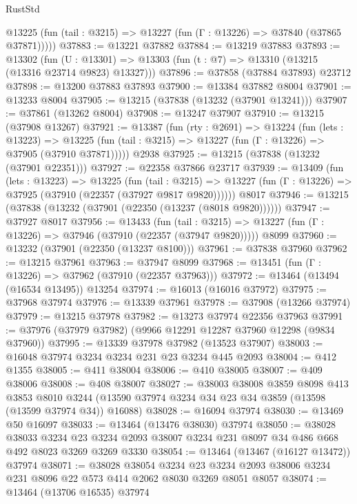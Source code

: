 \begin{lexlean}{RustStd}
\begin{coremodule}
      @13225 (fun (tail : @3215) => @13227 (fun (Γ : @13226) => @37840 (@37865 @37871)))))
@37883 := @13221 @37882
@37884 := @13219 @37883
@37893 := @13302
    (fun (U : @13301) => @13303 (fun (t : @7) => @13310 (@13215 (@13316 @23714 @9823) @13327)))
@37896 := @37858 (@37884 @37893) @23712
@37898 := @13200 @37883 @37893
@37900 := @13384 @37882 @8004
@37901 := @13233 @8004
@37905 := @13215 (@37838 (@13232 (@37901 @13241)))
@37907 := @37861 (@13262 @8004)
@37908 := @13247 @37907
@37910 := @13215 (@37908 @13267)
@37921 := @13387
    (fun (rty : @2691) =>
    @13224
      (fun (lets : @13223) =>
      @13225 (fun (tail : @3215) => @13227 (fun (Γ : @13226) => @37905 (@37910 @37871)))))
    @2938
@37925 := @13215 (@37838 (@13232 (@37901 @22351)))
@37927 := @22358 @37866 @23717
@37939 := @13409
    (fun (lets : @13223) =>
    @13225
      (fun (tail : @3215) =>
      @13227 (fun (Γ : @13226) => @37925 (@37910 (@22357 (@37927 @9817 @9820))))))
    @8017
@37946 := @13215 (@37838 (@13232 (@37901 (@22350 (@13237 (@8018 @9820))))))
@37947 := @37927 @8017
@37956 := @13433
    (fun (tail : @3215) => @13227 (fun (Γ : @13226) => @37946 (@37910 (@22357 (@37947 @9820)))))
    @8099
@37960 := @13232 (@37901 (@22350 (@13237 @8100)))
@37961 := @37838 @37960
@37962 := @13215 @37961
@37963 := @37947 @8099
@37968 := @13451 (fun (Γ : @13226) => @37962 (@37910 (@22357 @37963)))
@37972 := @13464 (@13494 (@16534 @13495)) @13254
@37974 := @16013 (@16016 @37972)
@37975 := @37968 @37974
@37976 := @13339 @37961
@37978 := @37908 (@13266 @37974)
@37979 := @13215 @37978
@37982 := @13273 @37974 @22356 @37963
@37991 := @37976 (@37979 @37982) (@9966 @12291 @12287 @37960 @12298 (@9834 @37960))
@37995 := @13339 @37978 @37982 (@13523 @37907)
@38003 := @16048 @37974 @3234 @3234 @231 @23 @3234 @445 @2093
@38004 := @412 @1355
@38005 := @411 @38004
@38006 := @410 @38005
@38007 := @409 @38006
@38008 := @408 @38007
@38027 := @38003
    @38008
    @3859
    @8098
    @413
    @3853
    @8010
    @3244
    (@13590 @37974 @3234 @34 @23 @34 @3859 (@13598 (@13599 @37974 @34)) @16088)
@38028 := @16094 @37974
@38030 := @13469 @50 @16097
@38033 := @13464 (@13476 @38030) @37974
@38050 := @38028
    @38033
    @3234
    @23
    @3234
    @2093
    @38007
    @3234
    @231
    @8097
    @34
    @486
    @668
    @492
    @8023
    @3269
    @3269
    @3330
@38054 := @13464 (@13467 (@16127 @13472)) @37974
@38071 := @38028
    @38054
    @3234
    @23
    @3234
    @2093
    @38006
    @3234
    @231
    @8096
    @22
    @573
    @414
    @2062
    @8030
    @3269
    @8051
    @8057
@38074 := @13464 (@13706 @16535) @37974

\end{coremodule}
\end{lexlean}
